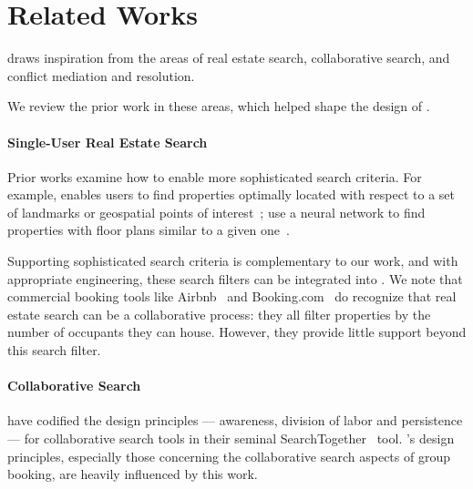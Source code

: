 \section{ Related Works}


\tool draws inspiration from the areas of real estate search, collaborative search, and conflict mediation and resolution. 

We review the prior work in these areas, which helped shape the design of \tool. 

\paragraph{Single-User Real Estate Search}

Prior works examine how to enable more sophisticated search criteria. For example, \citeauthor{lookupia} enables users to find properties optimally located with respect to a set of landmarks or geospatial points of interest~\cite{lookupia}; \citeauthor{floornet} use a neural network to find properties with floor plans similar to a given one~\cite{floornet}.  

Supporting sophisticated search criteria is complementary to our work, and with appropriate engineering, these search filters can be integrated into \tool.
We note that commercial booking tools like Airbnb~\cite{airbnb} and Booking.com~\cite{booking} do recognize that real estate search can be a collaborative process: they all filter properties by the number of occupants they can house. However, they provide little support beyond this search filter.


\paragraph{Collaborative Search}
\citeauthor{searchtogether} have codified the design principles --- awareness, division of labor and persistence --- for collaborative search tools in their seminal SearchTogether~\cite{searchtogether} tool. \tool's design principles, especially those concerning the collaborative search aspects of group booking, are heavily influenced by this work.


